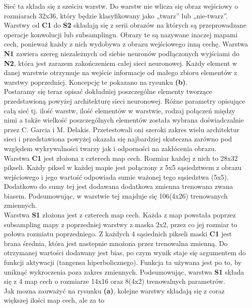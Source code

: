 \documentclass[11pt,a4paper]{article}
\begin{document}
Sieć ta składa się z sześciu warstw. Do warstw nie wlicza się obraz wejściowy o rozmiarach 32x36,
który będzie klasyfikowany jako „twarz” lub „nie-twarz”. \\
\indent 
Warstwy od \textbf {C1} do \textbf{S2} składają się z serii obrazów na których są przeprowadzane operacje konwolucji lub subsamplingu.
 Obrazy te są nazywane inaczej mapami cech, ponieważ każdy z nich wydobywa z obrazu wejściowego inną cechę. 
Warstwa  \textbf{N1} zawiera szereg niezależnych od siebie neuronów podłączonych wyjściami do  \textbf{N2}, 
która jest zarazem zakończeniem całej sieci neuronowej. Każdy element w danej warstwie otrzymuje 
na wejście informacje od małego zbioru elementów z warstwy poprzedniej. Koncepcję te pokazano na rysunku  \textbf{(b)}.\\
\indent 
Postaramy się teraz opisać dokładniej poszczególne elementy tworzące  przedstawioną powyżej architekturę 
sieci neuronowej. Różne parametry opisujące całą sieć tj. ilość warstw, ilość elementów w warstwie,
 rodzaj połączeń między nimi a także wielkość poszczególnych elementów została wybrana doświadczalnie przez C. 
Garcia i  M. Delakis. Przetestowali oni szeroki zakres wielu architektur sieci i przedstawiona powyżej okazała się
 najbardziej skuteczna zarówno pod względem wykrywalności twarzy jak i odporności na zakłócenia obrazu.\\
\indent 
Warstwa  \textbf {C1} jest złożona z czterech map cech. Rozmiar każdej z nich to 28x32 pikseli. 
Każdy piksel w każdej mapie jest połączony z 5x5 sąsiedztwem z obrazu wejściowego i jego wartość odpowiada
 sumie ważonej tego sąsiedztwa (5x5). Dodatkowo do sumy tej jest dodawana dodatkowa zmienna trenowana
 zwana biasem. Podsumowując, w warstwie tej znajduje się 106(4x26) trenowanych zmiennych.\\
\indent 
Warstwa  \textbf{S1} złożona jest z czterech map cech. Każda z map powstała poprzez subsampling mapy 
z poprzedniej warstwy z maska 2x2, przez co jej rozmiar to połowa rozmiatu poprzedniego. Z każdych 
4 sąsiednich pikseli maski \textbf{C1} jest brana średnia, która jest nastepnie mnożona przez trenowalna zmienną.
Do otrzymanej wartości dodawany jest bias, po czym wynik staje się argumentem do funkcji aktywacji 
(tangensa hiperbolicznego). Funkcja ta używana jest po to, by uniknąć wykroczenia poza zakres zmiennych.
Podsumowując, warstwa  \textbf{S1} składa się z 4 map cech o rozmiarze 14x16 oraz 8(4x2) trenowalnych parametrów.\\
\indent
Jak mozna zauważyć na rysunku  \textbf{(a)}, kolejne warstwy składają się z coraz większej ilości map cech, ale za to
\end{document}
